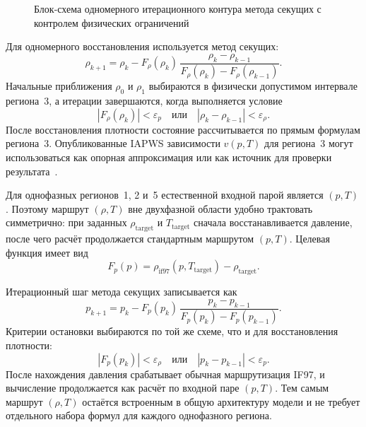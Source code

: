 \begin{figure}[htbp]
    \caption{Блок-схема одномерного итерационного контура метода секущих с контролем физических ограничений}
    \label{fig:secant_algorithm}
\end{figure}

Для одномерного восстановления используется метод секущих:
\begin{equation}
\rho_{k+1} = \rho_{k}
- F_{\rho}(\rho_{k})\,
\frac{\rho_{k}-\rho_{k-1}}
{F_{\rho}(\rho_{k})-F_{\rho}(\rho_{k-1})}.
\end{equation}
Начальные приближения $\rho_{0}$ и $\rho_{1}$
выбираются в физически допустимом интервале региона~3,
а итерации завершаются,
когда выполняется условие
\begin{equation}
|F_{\rho}(\rho_{k})| < \varepsilon_{p}
\quad \mbox{или} \quad
|\rho_{k}-\rho_{k-1}| < \varepsilon_{\rho}.
\end{equation}
После восстановления плотности
состояние рассчитывается по прямым формулам региона~3.
Опубликованные IAPWS зависимости $v(p, T)$ для региона~3
могут использоваться как опорная аппроксимация
или как источник для проверки результата~\cite{iapws_vpt_region3}.

Для однофазных регионов~1, 2 и~5
естественной входной парой является $(p, T)$.
Поэтому маршрут $(\rho, T)$
вне двухфазной области удобно трактовать симметрично:
при заданных $\rho_{\mathrm{target}}$ и $T_{\mathrm{target}}$
сначала восстанавливается давление,
после чего расчёт продолжается стандартным маршрутом $(p, T)$.
Целевая функция имеет вид
\begin{equation}
F_{p}(p) = \rho_{\mathrm{if97}}(p, T_{\mathrm{target}}) - \rho_{\mathrm{target}}.
\end{equation}

Итерационный шаг метода секущих записывается как
\begin{equation}
p_{k+1} = p_{k}
- F_{p}(p_{k})\,
\frac{p_{k}-p_{k-1}}
{F_{p}(p_{k})-F_{p}(p_{k-1})}.
\end{equation}
Критерии остановки выбираются по той же схеме,
что и для восстановления плотности:
\begin{equation}
|F_{p}(p_{k})| < \varepsilon_{\rho}
\quad \mbox{или} \quad
|p_{k}-p_{k-1}| < \varepsilon_{p}.
\end{equation}
После нахождения давления
срабатывает обычная маршрутизация IF97,
и вычисление продолжается как расчёт по входной паре $(p, T)$.
Тем самым маршрут $(\rho, T)$
остаётся встроенным в общую архитектуру модели
и не требует отдельного набора формул
для каждого однофазного региона.
